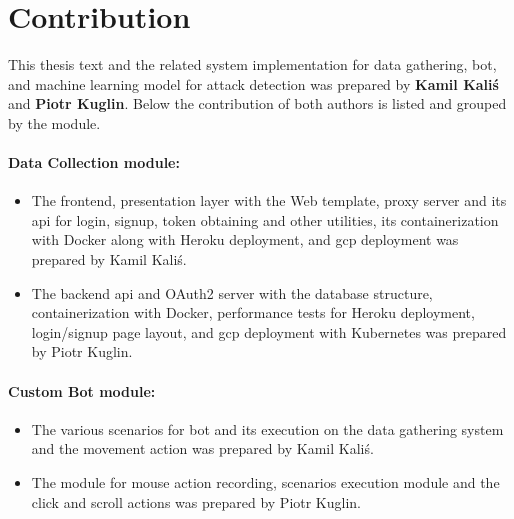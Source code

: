\section{Contribution}\label{sec:contribution}
This thesis text and the related system implementation for data gathering, bot, and machine learning model for attack detection was prepared by \textbf{Kamil Kaliś} and \textbf{Piotr Kuglin}.
Below the contribution of both authors is listed and grouped by the module.

\begin{minipage}{\textwidth}
    \paragraph{Data Collection module:}
    \begin{itemize}[label=$\bullet$]
        \item The frontend, presentation layer with the Web template, proxy server and its \gls{api} for login, signup, token obtaining and other utilities, its containerization with Docker along with Heroku deployment, and \gls{gcp} deployment was prepared by Kamil Kaliś.
        \item The backend \gls{api} and OAuth2 server with the database structure, containerization with Docker, performance tests for Heroku deployment, login/signup page layout, and \gls{gcp} deployment with Kubernetes was prepared by Piotr Kuglin.
    \end{itemize}
\end{minipage}

\begin{minipage}{\textwidth}
    \paragraph{Custom Bot module:}
    \begin{itemize}[label=$\bullet$]
        \item The various scenarios for bot and its execution on the data gathering system and the movement action was prepared by Kamil Kaliś.
        \item The module for mouse action recording, scenarios execution module and the click and scroll actions was prepared by Piotr Kuglin.
    \end{itemize}
\end{minipage}

